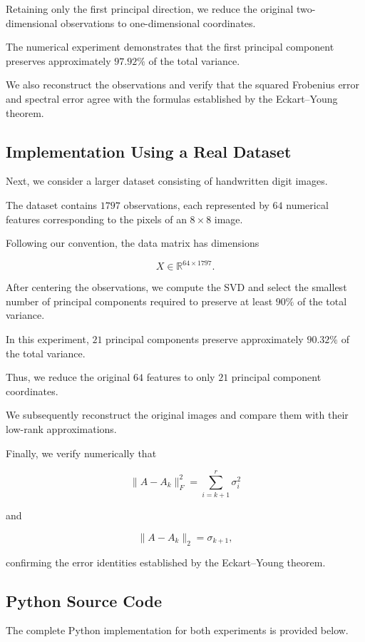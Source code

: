\documentclass[11pt]{article}
\begin{document}
Retaining only the first principal direction,
we reduce the original two-dimensional
observations to one-dimensional coordinates.

The numerical experiment demonstrates that
the first principal component preserves
approximately $97.92\%$ of the total variance.

We also reconstruct the observations and
verify that the squared Frobenius error and
spectral error agree with the formulas
established by the Eckart--Young theorem.

\subsection{Implementation Using a Real Dataset}

Next, we consider a larger dataset consisting
of handwritten digit images.

The dataset contains $1797$ observations,
each represented by $64$ numerical features
corresponding to the pixels of an $8\times8$
image.

Following our convention, the data matrix
has dimensions

\[
X\in\mathbb{R}^{64\times1797}.
\]

After centering the observations, we compute
the SVD and select the smallest number of
principal components required to preserve
at least $90\%$ of the total variance.

In this experiment, $21$ principal components
preserve approximately $90.32\%$ of the
total variance.

Thus, we reduce the original $64$ features
to only $21$ principal component coordinates.

We subsequently reconstruct the original
images and compare them with their
low-rank approximations.

Finally, we verify numerically that

\[
\|A-A_k\|_F^2
=
\sum_{i=k+1}^{r}\sigma_i^2
\]

and

\[
\|A-A_k\|_2=\sigma_{k+1},
\]

confirming the error identities established
by the Eckart--Young theorem.

\subsection{Python Source Code}

The complete Python implementation for both
experiments is provided below.
\end{document}
